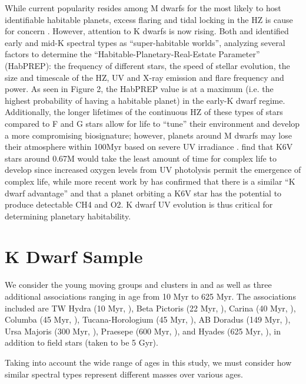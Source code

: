 \documentclass[twocolumn]{aastex62}
\begin{document}
While current popularity resides among M dwarfs for the most likely to host identifiable habitable planets, excess flaring and tidal locking in the HZ is cause for concern \citep[e.g.][]{Shields2016}. However, attention to K dwarfs is now rising. Both \citet{Heller2014} and \citet{Cuntz2016} identified early and mid-K spectral types as “super-habitable worlds”, analyzing several factors to determine the “Habitable-Planetary-Real-Estate Parameter” (HabPREP): the frequency of different stars, the speed of stellar evolution, the size and timescale of the HZ, UV and X-ray emission and flare frequency and power. As seen in Figure 2, the HabPREP value is at a maximum (i.e. the highest probability of having a habitable planet) in the early-K dwarf regime. Additionally, the longer lifetimes of the continuous HZ of these types of stars compared to F and G stars allow for life to “tune” their environment and develop a more compromising biosignature; however, planets around M dwarfs may lose their atmosphere within 100Myr based on severe UV irradiance \citep{Airapetian2017}. \citet{Lingam2017} find that K6V stars around 0.67M  would take the least amount of time for complex life to develop since increased oxygen levels from UV photolysis permit the emergence of complex life, while more recent work by \citet{Arney2017}
has confirmed that there is a similar “K dwarf advantage” and that a planet orbiting a K6V star has the potential to produce detectable CH4 and O2. K dwarf UV evolution is thus critical for determining planetary habitability.

\section{K Dwarf Sample}\label{sec:sample}

We consider the young moving groups and clusters in \citet{Shkolnik2014} and \citet{Schneider2018} as well as three additional associations ranging in age from 10 Myr to 625 Myr. The associations included are TW Hydra (10 Myr, \citealt{Bell2015}), Beta Pictoris (22 Myr, \citealt{Shkolnik2017}), Carina (40 Myr, \citealt{Torres2008}), Columba (45 Myr, \citealt{Zuckerman2011}), Tucana-Horologium (45 Myr, \citealt{Bell2015}), AB Doradus (149 Myr, \citealt{Bell2015}), Ursa Majoris (300 Myr, \citealt{King2005}), Praesepe (600 Myr, \citealt{Kraus2007}), and Hyades (625 Myr, \citealt{Perryman1997}), in addition to field stars (taken to be 5 Gyr).

Taking into account the wide range of ages in this study, we must consider how similar spectral types represent different masses over various ages. 
\end{document}
